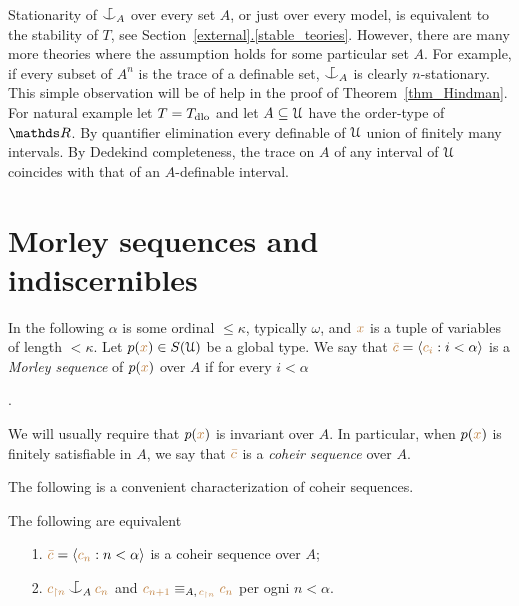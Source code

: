 \documentclass[creche.tex]{subfiles}
\begin{document}

\begin{remark}\label{rk_coheir_stationary}
Stationarity of $\nonforkc_A$ over every set $A$, or just over every model, is equivalent to the stability of $T$, see Section~\hyperref[stable_teories]{\ref*{external}.\ref*{stable_teories}}.
However, there are many more theories where the assumption holds for some particular set $A$.
For example, if every subset of $A^n$ is the trace of a definable set, $\nonforkc_A$ is clearly $n$-stationary.
This simple observation will be of help in the proof of Theorem~\ref{thm_Hindman}.
For natural example let $T=T_{\rm dlo}$ and let $A\subseteq\EuScript U$ have the order-type of $\RR$.
By quantifier elimination every definable of $\EuScript U$ union of finitely many intervals.
By Dedekind completeness, the trace on $A$ of any interval of $\EuScript U$ coincides with that of an $A$-definable interval. 
\end{remark}

\section{Morley sequences and indiscernibles}


In the following $\alpha$ is some ordinal $\le\kappa$, typically $\omega$, and ${\color{brown} x}$ is a tuple of variables of length $<\kappa$.
Let \mbox{$p({\color{brown} x})\in S(\EuScript U)$} be a global type.
We say that ${\color{brown}\bar c}=\langle{\color{brown}c_i}:i<\alpha\rangle$ is a \emph{Morley sequence\/} of $p({\color{brown} x})$ over $A$ if for every $i<\alpha$

.

We will usually require that $p({\color{brown} x})$ is invariant over $A$.
In particular, when $p({\color{brown} x})$ is finitely satisfiable in $A$, we say that ${\color{brown}\bar c}$ is a \emph{coheir sequence\/} over $A$.

The following is a convenient characterization of coheir sequences.

\begin{lemma}\label{lem_coheir_property}
The following are equivalent
\begin{itemize}
\item[1.] ${\color{brown}\bar c}=\langle{\color{brown}c_n}:n<\alpha\rangle$ is a coheir sequence over $A$;
\item[2.] ${\mr c_{\restriction n}}\nonforkc_A{\mr c_n}$ and ${\color{brown} c_{n+1}}\equiv_{A,\,{\color{brown} c_{\restriction n}}}{\color{brown} c_n}$ per ogni $n<\alpha$.
\end{itemize}
\end{lemma}
\end{document}
